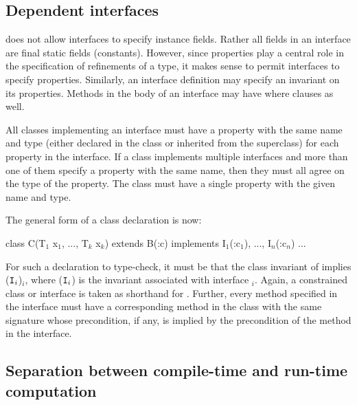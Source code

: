 
\subsection{Dependent interfaces}

\java{} does not allow interfaces to specify instance fields. Rather all
fields in an interface are final static fields (constants).
However,
since properties play a central role in the specification of
refinements of a type, it makes sense to permit interfaces to specify
properties.
Similarly, an interface
definition may specify an invariant on its properties.  Methods
in the body of an interface may have where clauses
as well.

All classes implementing an interface must have a property
with the same name and
type (either declared in the class or inherited from the superclass)
for each property in the interface. If a class implements
multiple interfaces and more than one of them specify a property
with the same name, then they must all agree on the type of the
property. The class must have a single property with the given name
and type.

The general form of a class declaration is now:
\begin{displayxten}
class C(T$_1$ x$_1$, ..., T$_k$ x$_k$)
      extends B(:c)
      implements I$_1$(:c$_1$), ..., I$_n$(:c$_n$) {...}
\end{displayxten}
\noindent
For such a declaration to type-check, it must be that the class
invariant of  implies \inv(${\tt I}_i$)$_i$, where
\inv(${\tt I}_i$) is the
invariant associated with interface $_i$.  Again, a constrained
class or interface  is taken as shorthand for .
Further, every method specified in the interface must have a
corresponding method in the class with the same signature whose
precondition, if any, is implied by the precondition of the method in
the interface.


\subsection{Separation between compile-time and run-time computation}

